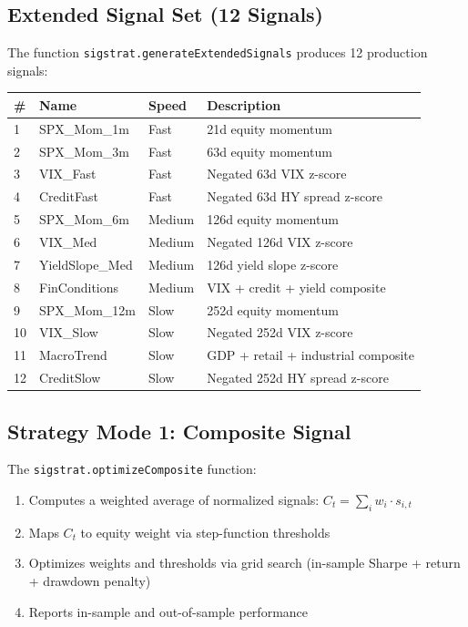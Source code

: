 \documentclass[11pt,a4paper]{article}
\begin{document}
\subsection{Extended Signal Set (12 Signals)}
The function \texttt{sigstrat.generateExtendedSignals} produces 12 production signals:

\begin{center}
\begin{tabularx}{\textwidth}{l l l X}
\toprule
\textbf{\#} & \textbf{Name} & \textbf{Speed} & \textbf{Description} \\
\midrule
1 & SPX\_Mom\_1m & Fast & 21d equity momentum \\
2 & SPX\_Mom\_3m & Fast & 63d equity momentum \\
3 & VIX\_Fast & Fast & Negated 63d VIX z-score \\
4 & CreditFast & Fast & Negated 63d HY spread z-score \\
5 & SPX\_Mom\_6m & Medium & 126d equity momentum \\
6 & VIX\_Med & Medium & Negated 126d VIX z-score \\
7 & YieldSlope\_Med & Medium & 126d yield slope z-score \\
8 & FinConditions & Medium & VIX + credit + yield composite \\
9 & SPX\_Mom\_12m & Slow & 252d equity momentum \\
10 & VIX\_Slow & Slow & Negated 252d VIX z-score \\
11 & MacroTrend & Slow & GDP + retail + industrial composite \\
12 & CreditSlow & Slow & Negated 252d HY spread z-score \\
\bottomrule
\end{tabularx}
\end{center}

\subsection{Strategy Mode 1: Composite Signal}
The \texttt{sigstrat.optimizeComposite} function:
\begin{enumerate}[leftmargin=2em]
  \item Computes a weighted average of normalized signals: $C_t = \sum_i w_i \cdot s_{i,t}$
  \item Maps $C_t$ to equity weight via step-function thresholds
  \item Optimizes weights and thresholds via grid search (in-sample Sharpe + return + drawdown penalty)
  \item Reports in-sample and out-of-sample performance
\end{enumerate}
\end{document}

